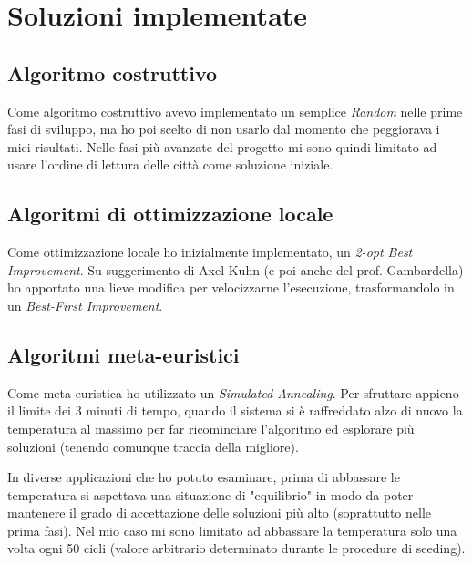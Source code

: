 \chapter*{Soluzioni implementate}
\label{cha_soluzioni}

\section*{Algoritmo costruttivo}
\label{sec_costruttivo}
Come algoritmo costruttivo avevo implementato un semplice \emph{Random} nelle prime fasi di sviluppo, ma ho poi scelto di non usarlo dal momento che peggiorava i miei risultati. Nelle fasi più avanzate del progetto mi sono quindi limitato ad usare l'ordine di lettura delle città come soluzione iniziale.

\section*{Algoritmi di ottimizzazione locale}
\label{sec_ottimizzazione}
Come ottimizzazione locale ho inizialmente implementato, un \emph{2-opt Best Improvement}. Su suggerimento di Axel Kuhn (e poi anche del prof. Gambardella) ho apportato una lieve modifica per velocizzarne l'esecuzione, trasformandolo in un \emph{Best-First Improvement}.

\section*{Algoritmi meta-euristici}
\label{sec_metaeuristici}
Come meta-euristica ho utilizzato un \emph{Simulated Annealing}. Per sfruttare appieno il limite dei 3 minuti di tempo, quando il sistema si è raffreddato alzo di nuovo la temperatura al massimo per far ricominciare l'algoritmo ed esplorare più soluzioni (tenendo comunque traccia della migliore). 

In diverse applicazioni che ho potuto esaminare, prima di abbassare le temperatura si aspettava una situazione di "equilibrio" in modo da poter mantenere il grado di accettazione delle soluzioni più alto (soprattutto nelle prima fasi). Nel mio caso mi sono limitato ad abbassare la temperatura solo una volta ogni 50 cicli (valore arbitrario determinato durante le procedure di seeding).
